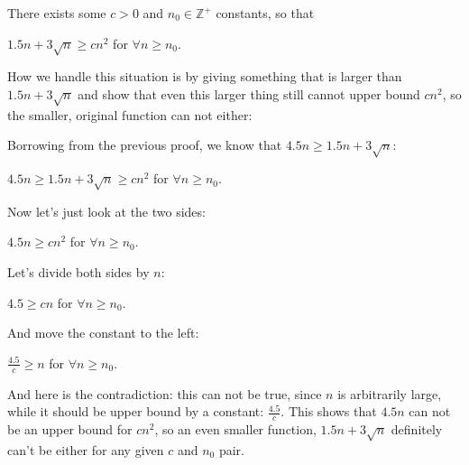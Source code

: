 There exists some $c>0$ and $n_0\in{}\mathds{Z^+}$ constants, so that

$1.5n + 3\sqrt{n} \geq{} cn^2$ for $\forall n\geq{}n_0$.

How we handle this situation is by giving something that is larger than $1.5n + 3\sqrt{n}$ and show that even this larger thing still cannot upper bound $cn^2$, so the smaller, original function can not either:

Borrowing from the previous proof, we know that $4.5n \geq{} 1.5n + 3\sqrt{n}$:

$4.5n \geq{} 1.5n + 3\sqrt{n} \geq{} cn^2$ for $\forall n\geq{}n_0$.

Now let's just look at the two sides:

$4.5n \geq{} cn^2$ for $\forall n\geq{}n_0$.

Let's divide both sides by $n$:

$4.5 \geq{} cn$ for $\forall n\geq{}n_0$.

And move the constant to the left:

$\frac{4.5}{c} \geq{} n$ for $\forall n\geq{}n_0$.

And here is the contradiction: this can not be true, since $n$ is arbitrarily large, while it should be upper bound by a constant: $\frac{4.5}{c}$. This shows that $4.5n$ can not be an upper bound for $cn^2$, so an even smaller function, $1.5n + 3\sqrt{n}$ definitely can't be either for any given $c$ and $n_0$ pair.